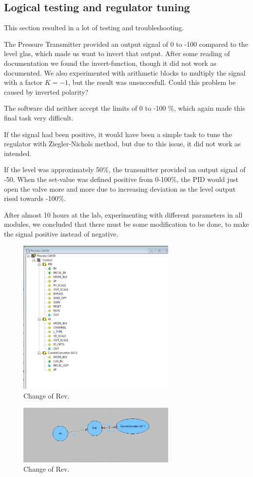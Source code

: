 \subsection{Logical testing and regulator tuning}
This section resulted in a lot of testing and troubleshooting.

The Pressure Transmitter provided an output signal of 0 to -100 compared to the level glas, which made us want to invert that output. After some reading of documentation we found the invert-function, though it did not work as documented. We also experimented with arithmetic blocks to multiply the signal with a factor $K = -1$, but the result was unsuccesfull. 
Could this problem be caused by inverted polarity?

The software did neither accept the limits of 0 to -100 \%, which again made this final task very difficult.

If the signal had been positive, it would have been a simple task to tune the regulator with Ziegler-Nichols method, but due to this issue, it did not work as intended.

If the level was approximately 50\%, the transmitter provided an output signal of -50. When the set-value was defined positive from 0-100\%, the PID would just open the valve more and more due to increasing deviation as the level output rised towards -100\%.

After almost 10 hours at the lab, experimenting with different parameters in all modules, we concluded that there must be some modification to be done, to make the signal positive instead of negative.

\begin{figure}[!htb]
    \centering
    \includegraphics[width=0.7\textwidth]{images/PId_Process}
    \caption{Change of Rev.}
    \end{figure}
    
    
\begin{figure}[!htb]
    \centering
    \includegraphics[width=0.7\textwidth]{images/ControlPID}
    \caption{Change of Rev.}
    \end{figure}

